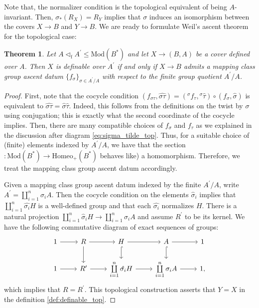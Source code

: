 \documentclass[10pt]{amsart}
\newtheorem{theorem}{Theorem}
\theoremstyle{definition}
\begin{document}
Note that, the normalizer condition is the topological equivalent of being $A$-invariant. Then, $\sigma_*(R_X) = R_Y$ implies that $\sigma $ induces an isomorphism between the covers $X\to B$ and $Y\rightarrow B$.
We are ready to formulate Weil's ascent theorem for the topological case:

\begin{theorem} \label{thm:Weil topological}
    Let $A \lhd_{\mathrm{f}} A^{\prime}  \leq \mathrm{Mod}(B^*) $ and let $X \to (B,A)$ be a cover defined over $A$. Then $X$ is definable over $A^\prime$ if and only if $X\to B$ admits a mapping class group ascent datum $\{ f_\sigma \} _{\sigma \in A^\prime /A }$ with respect to the finite group quotient $A^\prime /A $.
\end{theorem}


\begin{proof}
    First, note that the cocycle condition $(f_{\sigma \tau} , \widehat{\sigma \tau}) = ({^\sigma f_\tau} , {^\sigma \hat{\tau}}) \circ (f_\sigma , \hat{\sigma})$ is equivalent to $\widehat{\sigma\tau} = \hat \sigma \hat \tau$. Indeed, this follows from the definitions on the twist by $\sigma$ using conjugation; this is exactly what the second coordinate of the cocycle implies. Then, there are many compatible choices of $f_\sigma$ and $f_\tau$ as we explained in the discussion after diagram \ref{eq:sigma_tilde_top}. 
    Thus, for a suitable choice of (finite) elements indexed by $A^\prime/A$, we have that the section $ \hat{} : \mathrm{Mod}(B^*) \rightarrow \mathrm{Homeo}_+(B^*)$ behaves like) a homomorphism. Therefore, we treat the mapping class group ascent datum accordingly.
    


    Given a mapping class group ascent datum indexed by the finite $A^\prime/A$, write $A^\prime = \coprod_{i=1}^n \sigma_i A$. Then the cocycle condition on the elements $\hat\sigma_i$ implies that $\coprod_{i=1}^n \hat{\sigma_i}H$ is a well-defined group and that each $\hat{\sigma_i}$ normalizes $H$. There is a natural projection $\coprod_{i=1}^n \hat{\sigma}_i H \rightarrow  \coprod_{i=1}^n \sigma_i A$ and assume $R^\prime$ to be its kernel. We have the following commutative diagram of exact sequences of groups:
\begin{equation*}
    \begin{tikzcd}
1 \arrow[r] & R \arrow[r] \arrow[d] & H \arrow[r] \arrow[d, hook]                       & A \arrow[r] \arrow[d, hook]                 & 1 \\
1 \arrow[r] & R^\prime \arrow[r]    & \coprod\limits_{i=1}^n \hat{\sigma_i} H \arrow[r] & \coprod\limits_{i=1}^n \sigma_i A \arrow[r] & 1,
\end{tikzcd} 
\end{equation*} which implies that $R=R^\prime$. This topological construction asserts that $Y = X$ in the definition \ref{def:definable_top}. 


\end{proof}
\end{document}

